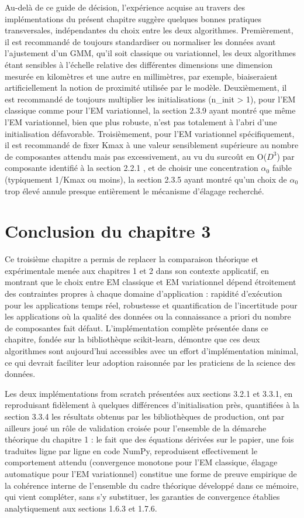 Au-delà de ce guide de décision, l'expérience acquise au travers des implémentations du présent chapitre suggère quelques bonnes pratiques transversales, indépendantes du choix entre les deux algorithmes. Premièrement, il est recommandé de toujours standardiser ou normaliser les données avant l'ajustement d'un GMM, qu'il soit classique ou variationnel, les deux algorithmes étant sensibles à l'échelle relative des différentes dimensions  une dimension mesurée en kilomètres et une autre en millimètres, par exemple, biaiseraient artificiellement la notion de proximité utilisée par le modèle. Deuxièmement, il est recommandé de toujours multiplier les initialisations (n\_init > 1), pour l'EM classique comme pour l'EM variationnel, la section 2.3.9 ayant montré que même l'EM variationnel, bien que plus robuste, n'est pas totalement à l'abri d'une initialisation défavorable. Troisièmement, pour l'EM variationnel spécifiquement, il est recommandé de fixer Kmax à une valeur sensiblement supérieure au nombre de composantes attendu  mais pas excessivement, au vu du surcoût en O($D^{3}$) par composante identifié à la section 2.2.1 , et de choisir une concentration $\alpha _{0}$ faible (typiquement 1/Kmax ou moins), la section 2.3.5 ayant montré qu'un choix de $\alpha _{0}$ trop élevé annule presque entièrement le mécanisme d'élagage recherché.

\section{Conclusion du chapitre 3}
Ce troisième chapitre a permis de replacer la comparaison théorique et expérimentale menée aux chapitres 1 et 2 dans son contexte applicatif, en montrant que le choix entre EM classique et EM variationnel dépend étroitement des contraintes propres à chaque domaine d'application : rapidité d'exécution pour les applications temps réel, robustesse et quantification de l'incertitude pour les applications où la qualité des données ou la connaissance a priori du nombre de composantes fait défaut. L'implémentation complète présentée dans ce chapitre, fondée sur la bibliothèque scikit-learn, démontre que ces deux algorithmes sont aujourd'hui accessibles avec un effort d'implémentation minimal, ce qui devrait faciliter leur adoption raisonnée par les praticiens de la science des données.

Les deux implémentations from scratch présentées aux sections 3.2.1 et 3.3.1, en reproduisant fidèlement  à quelques différences d'initialisation près, quantifiées à la section 3.3.4  les résultats obtenus par les bibliothèques de production, ont par ailleurs joué un rôle de validation croisée pour l'ensemble de la démarche théorique du chapitre 1 : le fait que des équations dérivées sur le papier, une fois traduites ligne par ligne en code NumPy, reproduisent effectivement le comportement attendu (convergence monotone pour l'EM classique, élagage automatique pour l'EM variationnel) constitue une forme de preuve empirique de la cohérence interne de l'ensemble du cadre théorique développé dans ce mémoire, qui vient compléter, sans s'y substituer, les garanties de convergence établies analytiquement aux sections 1.6.3 et 1.7.6.

